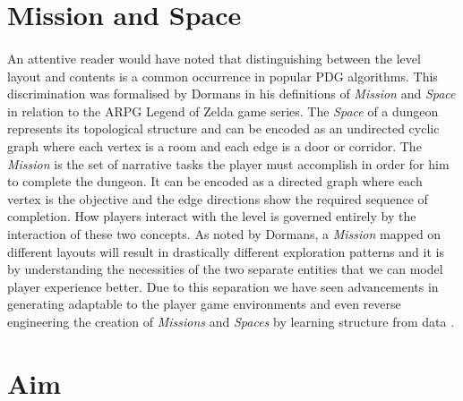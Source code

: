 \documentclass{UoYCSproject}
\begin{document}
\section{Mission and Space}

\paragraph{}
An attentive reader would have noted that distinguishing between the level layout and contents is a common occurrence in popular PDG algorithms. This discrimination was formalised by Dormans \parencite{DormansMS} in his definitions of \textit{Mission} and \textit{Space} in relation to the ARPG Legend of Zelda game series.
The \textit{Space} of a dungeon represents its topological structure and can be encoded as an undirected cyclic graph where each vertex is a room and each edge is a door or corridor. The \textit{Mission} is the set of narrative tasks the player must accomplish in order for him to complete the dungeon. It can be encoded as a directed graph where each vertex is the objective and the edge directions show the required sequence of completion. How players interact with the level is governed entirely by the interaction of these two concepts. As noted by Dormans, a \textit{Mission} mapped on different layouts will result in drastically different exploration patterns and it is by understanding the necessities of the two separate entities that we can model player experience better. Due to this separation we have seen advancements in generating adaptable to the player game environments \parencite{DormansAE} and even reverse engineering the creation of \textit{Missions} and \textit{Spaces} by learning structure from data \parencite{SummervilleLearningOfZelda}.

\section{Aim}
\end{document}
